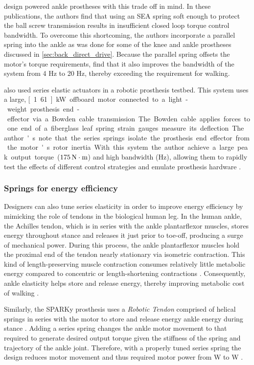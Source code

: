 \citet{au2007biomechanical, au2008powered} design powered ankle prostheses with
this trade off in mind. In these publications, the authors find that using an
SEA spring soft enough to protect the ball screw transmission results in
insufficient closed loop torque control bandwidth. To overcome this shortcoming,
the authors incorporate a parallel spring into the ankle as was done for some of
the knee and ankle prostheses discussed in \cref{sec:back_direct_drive}. Because
the parallel spring offsets the motor's torque requirements,
\citeauthor{au2008powered} find that it also improves the bandwidth of the
system from 4 Hz to 20 Hz, thereby exceeding the requirement for walking. 

\citet{caputo2013experimental} also used series elastic actuators in a robotic
prosthesis testbed. This system uses a large, \unit[1.61]{kW} offboard motor
connected to a light-weight prosthesis end-effector via a Bowden cable
transmission. The Bowden cable applies forces to one end of a fiberglass leaf
spring strain gauges measure its deflection. The author's note that the series 
springs isolate the prosthesis end effector from the motor's rotor inertia. With
this system the author achieve a large peak output torque ($\unit[175]{N \cdot m}$)
and high bandwidth (\unit[17]{Hz}), allowing them to rapidly test the effects of
different control strategies and emulate prosthesis hardware
\citep{caputo2015informing}.

\subsubsection{Springs for energy efficiency}
Designers can also tune series elasticity in order to improve energy efficiency
by mimicking the role of tendons in the biological human leg. In the human
ankle, the Achilles tendon, which is in series with the ankle plantarflexor
muscles, stores energy throughout stance and releases it just prior to toe-off,
producing a surge of mechanical power. During this process, the ankle
plantarflexor muscles hold the proximal end of the tendon nearly stationary via
isometric contraction. This kind of length-preserving muscle contraction
consumes relatively little metabolic energy compared to concentric or
length-shortening contractions \citep{rall1984energetic}. Consequently, ankle
elasticity helps store and release energy, thereby improving metabolic cost of
walking \citep{sawicki2009pays}.

Similarly, the SPARKy prosthesis uses a \emph{Robotic Tendon} comprised of
helical springs in series with the motor to store and release energy ankle
energy during stance \citep{hitt2007sparky, bellman2008sparky,
holgate2008sparky}. Adding a series spring changes the ankle motor movement to
that required to generate desired output torque given the stiffness of the
spring and trajectory of the ankle joint. Therefore, with a properly tuned series spring the
design reduces motor movement and thus required motor power from \unit[250]{W}
to \unit[77]{W} \citep{hitt2007sparky}.


